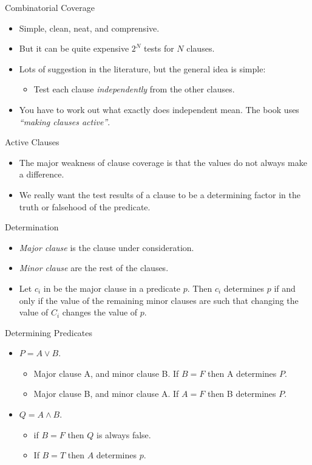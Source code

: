 \documentclass{beamer}
\begin{document}
\begin{frame}{Combinatorial Coverage}
  \begin{itemize}
    \item Simple, clean, neat, and comprensive.
  \item But it can be quite expensive $2^N$ tests for $N$ clauses. 
  \item Lots of suggestion in the literature, but the general idea is
    simple:
    \begin{itemize}
    \item Test each clause {\em independently} from the other clauses.
    \end{itemize}
  \item You have to work out what exactly does independent mean. The
    book uses {\em ``making clauses active''}.
  \end{itemize}
\end{frame}
\begin{frame}{Active Clauses}
  \begin{itemize}
  \item The major weakness of clause coverage is that the values do
    not always make a difference.
  \item We really want the test results of a clause to be a
    determining factor in the truth or falsehood of the predicate.
  \end{itemize}
  
\end{frame}
\begin{frame}{Determination}
  \begin{itemize}
  \item {\em Major clause}  is the clause under consideration.
  \item {\em Minor clause}  are the rest of the clauses.
  \item Let $c_i$ in  be the major clause in a predicate $p$. Then
    $c_i$ determines $p$ if and only if the value of the remaining
    minor clauses are such that changing the value of $C_i$ changes
    the value of $p$. 
  \end{itemize}
  
\end{frame}
\begin{frame}{Determining Predicates}

  \begin{itemize}
  \item $P = A \lor B$.
    \begin{itemize}
    \item Major clause A, and minor clause B. If $B=F$ then A determines $P$. 
    \item Major clause B, and minor clause A. If $A=F$ then B determines $P$.
    \end{itemize}
  \item $Q = A \land B$.
    \begin{itemize}
    \item if $B=F$ then $Q$ is always false. 
    \item If $B=T$ then $A$ determines $p$.
    \end{itemize}
  \end{itemize}
  \end{frame}
\end{document}
